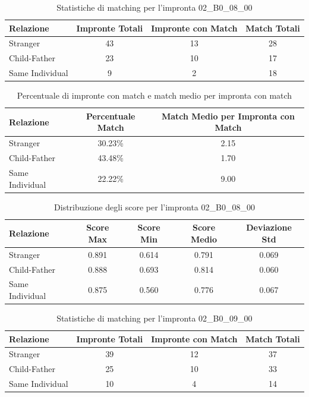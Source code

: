 \begin{table}[htbp]
\centering
\caption{Statistiche di matching per l'impronta 02\_B0\_08\_00}
\label{tab:results_02_B0_08_00}
\begin{tabular}{|l|c|c|c|}
\hline
\textbf{Relazione} & \textbf{Impronte Totali} & \textbf{Impronte con Match} & \textbf{Match Totali} \\
\hline
Stranger & 43 & 13 & 28 \\
\hline
Child-Father & 23 & 10 & 17 \\
\hline
Same Individual & 9 & 2 & 18 \\
\hline
\end{tabular}
\end{table}


\begin{table}[htbp]
\centering
\caption{Percentuale di impronte con match e match medio per impronta con match}
\label{tab:match_percentage_02_B0_08_00}
\begin{tabular}{|l|c|c|}
\hline
\textbf{Relazione} & \textbf{Percentuale Match} & \textbf{Match Medio per Impronta con Match} \\
\hline
Stranger & 30.23\% & 2.15 \\
\hline
Child-Father & 43.48\% & 1.70 \\
\hline
Same Individual & 22.22\% & 9.00 \\
\hline
\end{tabular}
\end{table}


\begin{table}[htbp]
\centering
\caption{Distribuzione degli score per l'impronta 02\_B0\_08\_00}
\label{tab:scores_02_B0_08_00}
\begin{tabular}{|l|c|c|c|c|}
\hline
\textbf{Relazione} & \textbf{Score Max} & \textbf{Score Min} & \textbf{Score Medio} & \textbf{Deviazione Std} \\
\hline
Stranger & 0.891 & 0.614 & 0.791 & 0.069 \\
\hline
Child-Father & 0.888 & 0.693 & 0.814 & 0.060 \\
\hline
Same Individual & 0.875 & 0.560 & 0.776 & 0.067 \\
\hline
\end{tabular}
\end{table}


\begin{table}[htbp]
\centering
\caption{Statistiche di matching per l'impronta 02\_B0\_09\_00}
\label{tab:results_02_B0_09_00}
\begin{tabular}{|l|c|c|c|}
\hline
\textbf{Relazione} & \textbf{Impronte Totali} & \textbf{Impronte con Match} & \textbf{Match Totali} \\
\hline
Stranger & 39 & 12 & 37 \\
\hline
Child-Father & 25 & 10 & 33 \\
\hline
Same Individual & 10 & 4 & 14 \\
\hline
\end{tabular}
\end{table}


